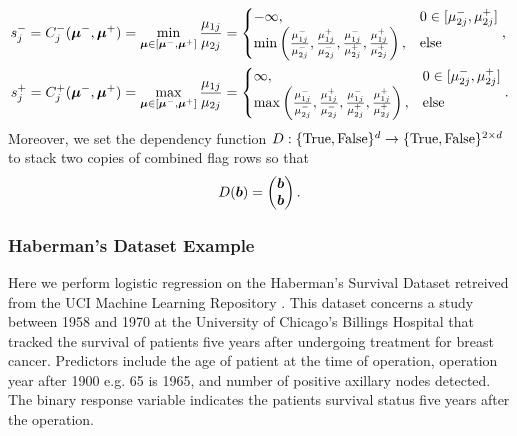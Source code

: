 \documentclass{article}[12pt]
\begin{document}
\begin{align*}
    s_j^- = C_j^-(\boldsymbol{\mu}^-,\boldsymbol{\mu}^+) &= \min_{\boldsymbol{\mu} \in [\boldsymbol{\mu}^-,\boldsymbol{\mu}^+]} \frac{\mu_{1j}}{\mu_{2j}} = 
    \begin{cases}
        -\infty, & 0 \in [\mu_{2j}^-,\mu_{2j}^+] \\
        \min\left(\frac{\mu_{1j}^-}{\mu_{2j}^-},\frac{\mu_{1j}^+}{\mu_{2j}^-},\frac{\mu_{1j}^-}{\mu_{2j}^+},\frac{\mu_{1j}^+}{\mu_{2j}^+}\right), & \text{else}
    \end{cases}, \\
    s_j^+ = C_j^+(\boldsymbol{\mu}^-,\boldsymbol{\mu}^+) &= \max_{\boldsymbol{\mu} \in [\boldsymbol{\mu}^-,\boldsymbol{\mu}^+]} \frac{\mu_{1j}}{\mu_{2j}} =
    \begin{cases}
        \infty, & 0 \in [\mu_{2j}^-,\mu_{2j}^+] \\
         \max\left(\frac{\mu_{1j}^-}{\mu_{2j}^-},\frac{\mu_{1j}^+}{\mu_{2j}^-},\frac{\mu_{1j}^-}{\mu_{2j}^+},\frac{\mu_{1j}^+}{\mu_{2j}^+}\right), & \text{else}
    \end{cases}.
\end{align*}
Moreover, we set the dependency function $D: \{\text{True},\text{False}\}^d \to \{\text{True},\text{False}\}^{2 \times d}$ to stack two copies of combined flag rows so that 
\begin{equation*}
    D(\boldsymbol{b}) =  \begin{pmatrix} \boldsymbol{b} \\ \boldsymbol{b} \end{pmatrix}.
\end{equation*}

\subsubsection{Haberman's Dataset Example}

Here we perform logistic regression on the Haberman's Survival Dataset retreived from the UCI Machine Learning Repository \cite{uci_ml_repo}. This dataset concerns a study between 1958 and 1970 at the University of Chicago's Billings Hospital that tracked the survival of patients five years after undergoing treatment for breast cancer. Predictors include the age of patient at the time of operation, operation year after 1900 e.g. 65 is 1965, and number of positive axillary nodes detected. The binary response variable indicates the patients survival status five years after the operation. 
\end{document}
